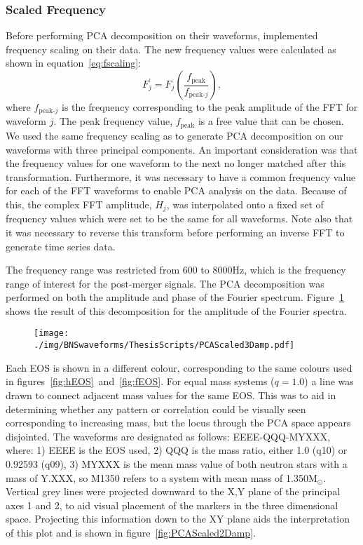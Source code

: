 \subsubsection{Scaled Frequency}
\label{sec:PCAScaled}
Before performing PCA decomposition on their waveforms, \cite{Clark2015} implemented frequency scaling on their data. The new frequency values were calculated as  shown in equation~\ref{eq:fscaling}:
\begin{equation}
	F_j^{'}=F_j\left(\dfrac{f_{\text{peak}}}{f_{\text{peak-}j}}\right),
	\label{eq:fscaling}
\end{equation} 
where $f_{\text{peak-}j}$ is the frequency corresponding to the peak amplitude of the FFT for waveform $j$. The peak frequency value, $f_{\text{peak}}$ is a free value that can be chosen. We used the same frequency scaling as \cite{Clark2015} to generate PCA decomposition on our waveforms with three principal components. An important consideration was that the frequency values for one waveform to the next no longer matched after this transformation. Furthermore, it was necessary to have a common frequency value for each of the FFT waveforms to enable PCA analysis on the data. Because of this, the complex FFT amplitude, $H_j$, was interpolated onto a fixed set of frequency values which were set to be the same for all waveforms. Note also that it was necessary to reverse this transform before performing an inverse FFT to generate time series data.\par The frequency range was restricted from 600 to 8000Hz, which is the frequency range of interest for the post-merger signals. The PCA decomposition was performed on both the amplitude and phase of the Fourier spectrum. Figure~\ref{fig:PCAScaled3Damp} shows the result of this decomposition for the amplitude of the Fourier spectra. 
\begin{figure}[H]
	\centering
	\texttt{[image: ./img/BNSwaveforms/ThesisScripts/PCAScaled3Damp.pdf]} 
	\caption[\protect]{\protect}
	\label{fig:PCAScaled3Damp}
\end{figure}
Each EOS is shown in a different colour, corresponding to the same colours used in figures~\ref{fig:hEOS}~and~\ref{fig:fEOS}. For equal mass systems ($q=1.0$) a line was drawn to connect adjacent mass values for the same EOS. This was to aid in determining whether any pattern or correlation could be visually seen corresponding to increasing mass, but the locus through the PCA space appears disjointed. The waveforms are designated as follows: EEEE-QQQ-MYXXX, where: 1) EEEE is the EOS used, 2) QQQ is the mass ratio, either 1.0 (q10) or 0.92593 (q09), 3) MYXXX is the mean mass value of both neutron stars with a mass of Y.XXX, so M1350 refers to a system with mean mass of 1.350M$_\odot$. Vertical grey lines were projected downward to the X,Y plane of the principal axes 1 and 2, to aid visual placement of the markers in the three dimensional space. Projecting this information down to the XY plane aids the interpretation of this plot  and is shown in figure~\ref{fig:PCAScaled2Damp}.
